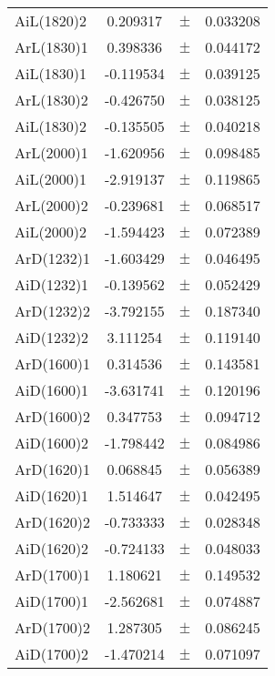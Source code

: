 \begin{table}
\begin{tiny}
\begin{tabular}{lccc}
AiL(1820)2 & 0.209317 & $\pm$ & 0.033208 \\
ArL(1830)1 & 0.398336 & $\pm$ & 0.044172 \\
AiL(1830)1 & -0.119534 & $\pm$ & 0.039125 \\
ArL(1830)2 & -0.426750 & $\pm$ & 0.038125 \\
AiL(1830)2 & -0.135505 & $\pm$ & 0.040218 \\
ArL(2000)1 & -1.620956 & $\pm$ & 0.098485 \\
AiL(2000)1 & -2.919137 & $\pm$ & 0.119865 \\
ArL(2000)2 & -0.239681 & $\pm$ & 0.068517 \\
AiL(2000)2 & -1.594423 & $\pm$ & 0.072389 \\
ArD(1232)1 & -1.603429 & $\pm$ & 0.046495 \\
AiD(1232)1 & -0.139562 & $\pm$ & 0.052429 \\
ArD(1232)2 & -3.792155 & $\pm$ & 0.187340 \\
AiD(1232)2 & 3.111254 & $\pm$ & 0.119140 \\
ArD(1600)1 & 0.314536 & $\pm$ & 0.143581 \\
AiD(1600)1 & -3.631741 & $\pm$ & 0.120196 \\
ArD(1600)2 & 0.347753 & $\pm$ & 0.094712 \\
AiD(1600)2 & -1.798442 & $\pm$ & 0.084986 \\
ArD(1620)1 & 0.068845 & $\pm$ & 0.056389 \\
AiD(1620)1 & 1.514647 & $\pm$ & 0.042495 \\
ArD(1620)2 & -0.733333 & $\pm$ & 0.028348 \\
AiD(1620)2 & -0.724133 & $\pm$ & 0.048033 \\
ArD(1700)1 & 1.180621 & $\pm$ & 0.149532 \\
AiD(1700)1 & -2.562681 & $\pm$ & 0.074887 \\
ArD(1700)2 & 1.287305 & $\pm$ & 0.086245 \\
AiD(1700)2 & -1.470214 & $\pm$ & 0.071097 \\
\bottomrule
\end{tabular}
\end{tiny}
\end{table}

\clearpage


